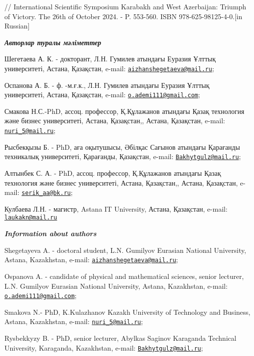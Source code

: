 \documentclass[
]{article}
\begin{document}
// International Scientific Symposium Karabakh and West Azerbaijan:
Triumph of Victory. The 26th of October 2024. - P. 553-560. ISBN
978-625-98125-4-0.{[}in Russian{]}

\emph{\textbf{Авторлар туралы мәліметтер}}

Шегетаева А. К. - докторант, Л.Н. Гумилев атындағы Еуразия Ұлттық
университеті, Астана, Қазақстан, e-mail:
\href{mailto:aizhanshegetaeva@mail.ru}{\nolinkurl{aizhanshegetaeva@mail.ru}};

Оспанова А. Б. - ф. -м.ғ.к., Л.Н. Гумилев атындағы Еуразия Ұлттық
университеті, Астана, Қазақстан, e-mail:
\href{mailto:o.ademi111@gmail.com}{\nolinkurl{o.ademi111@gmail.com}};

Смакова Н.С.-PhD, ассоц. профессор, Қ.Құлажанов атындағы Қазақ
технология және бизнес университеті, Астана, Қазақстан,, Астана,
Қазақстан, e-mail:
\href{mailto:nuri_5@mail.ru}{\nolinkurl{nuri\_5@mail.ru}};

Рысбекқызы Б. - PhD, аға оқытушысы, Әбілқас Сағынов атындағы Қарағанды
техникалық университеті, Қарағанды, Қазақстан, e-mail:
\href{mailto:Bakhytgulz@mail.ru}{\nolinkurl{Bakhytgulz@mail.ru}};

Алтынбек С. А. - PhD, ассоц. профессор, Қ.Құлажанов атындағы Қазақ
технология және бизнес университеті, Астана, Қазақстан,, Астана,
Қазақстан, e-mail:
\href{mailto:serik_aa@bk.ru}{\nolinkurl{serik\_aa@bk.ru}};

Кулбаева Л.Н. - магистр, Astana IT University, Астана, Қазақстан,
e-mail: \href{mailto:laukakn@mail.ru}{\nolinkurl{laukakn@mail.ru}}

\emph{\textbf{Information about authors}}

Shegetayeva A. - doctoral student, L.N. Gumilyov Eurasian National
University, Astana, Kazakhstan, e-mail:
\href{mailto:aizhanshegetaeva@mail.ru}{\nolinkurl{aizhanshegetaeva@mail.ru}};

Ospanova A. - candidate of physical and mathematical sciences, senior
lecturer, L.N. Gumilyov Eurasian National University, Astana,
Kazakhstan, e-mail:
\href{mailto:o.ademi111@gmail.com}{\nolinkurl{o.ademi111@gmail.com}};

Smakova N.- PhD, K.Kulazhanov Kazakh University of Technology and
Business, Astana, Kazakhstan, e-mail:
\href{mailto:nuri_5@mail.ru}{\nolinkurl{nuri\_5@mail.ru}};

Rysbekkyzy B. - PhD, senior lecturer, Abylkas Saginov Karaganda
Technical University, Karaganda, Kazakhstan, e-mail:
\href{mailto:Bakhytgulz@mail.ru}{\nolinkurl{Bakhytgulz@mail.ru}};
\end{document}
